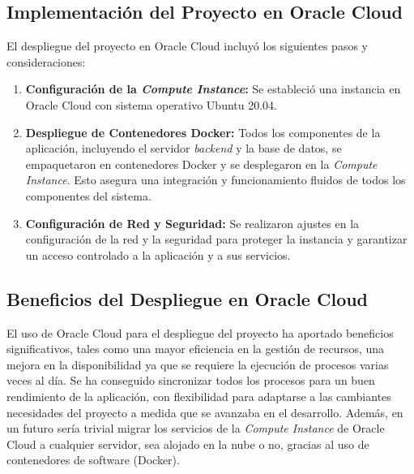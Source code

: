 \clearpage
\subsection{Implementación del Proyecto en Oracle Cloud}

El despliegue del proyecto en Oracle Cloud incluyó los siguientes pasos y consideraciones:

\begin{enumerate}
    \item \textbf{Configuración de la \textit{Compute Instance}:} Se estableció una instancia en Oracle Cloud con sistema operativo Ubuntu 20.04.

    \item \textbf{Despliegue de Contenedores Docker:} Todos los componentes de la aplicación, incluyendo el servidor \textit{backend} y la base de datos, se empaquetaron en contenedores Docker y se desplegaron en la \textit{Compute Instance}. Esto asegura una integración y funcionamiento fluidos de todos los componentes del sistema.

    \item \textbf{Configuración de Red y Seguridad:} Se realizaron ajustes en la configuración de la red y la seguridad para proteger la instancia y garantizar un acceso controlado a la aplicación y a sus servicios.
\end{enumerate}

\subsection{Beneficios del Despliegue en Oracle Cloud}

El uso de Oracle Cloud para el despliegue del proyecto ha aportado beneficios significativos, tales como una mayor eficiencia en la gestión de recursos, una mejora en la disponibilidad ya que se requiere la ejecución de procesos varias veces al día. Se ha conseguido sincronizar todos los procesos para un buen rendimiento de la aplicación, con flexibilidad para adaptarse a las cambiantes necesidades del proyecto a medida que se avanzaba en el desarrollo. Además, en un futuro sería trivial migrar los servicios de la \textit{\textit{Compute Instance}} de Oracle Cloud a cualquier servidor, sea alojado en la nube o no, gracias al uso de contenedores de software (Docker).

